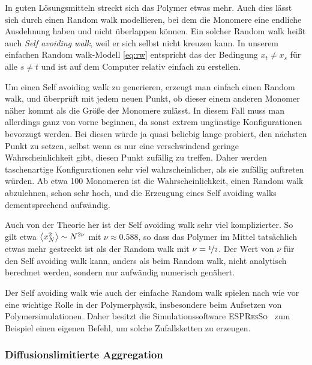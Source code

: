 In guten Lösungsmitteln streckt sich das Polymer etwas mehr. Auch dies
lässt sich durch einen Random walk modellieren, bei dem die Monomere
eine endliche Ausdehnung haben und nicht überlappen können. Ein
solcher Random walk heißt auch \emph{Self avoiding walk}, weil er sich
selbst nicht kreuzen kann. In unserem einfachen Random walk-Modell
\eqref{eq:rw} entspricht das der Bedingung $x_t\neq x_s$ für alle
$s\neq t$ und ist auf dem Computer relativ einfach zu erstellen.

Um einen Self avoiding walk zu generieren, erzeugt man einfach einen
Random walk, und überprüft mit jedem neuen Punkt, ob dieser einem
anderen Monomer näher kommt als die Größe der Monomere zulässt. In
diesem Fall muss man allerdings ganz von vorne beginnen, da sonst
extrem ungünstige Konfigurationen bevorzugt werden. Bei diesen würde
ja quasi beliebig lange probiert, den nächsten Punkt zu setzen, selbst
wenn es nur eine verschwindend geringe Wahrscheinlichkeit gibt, diesen
Punkt zufällig zu treffen. Daher werden taschenartige Konfigurationen
sehr viel wahrscheinlicher, als sie zufällig auftreten würden. Ab etwa
100 Monomeren ist die Wahrscheinlichkeit, einen Random walk
abzulehnen, schon sehr hoch, und die Erzeugung eines Self avoiding
walks dementsprechend aufwändig.

Auch von der Theorie her ist der Self avoiding walk sehr viel
komplizierter. So gilt etwa $\left\langle{x_N^2}\right\rangle \sim N^{2\nu}$ mit
$\nu\approx 0.588$, so dass das Polymer im Mittel tatsächlich etwas
mehr gestreckt ist als der Random walk mit $\nu=\nicefrac{1}{2}$. Der
Wert von $\nu$ für den Self avoiding walk kann, anders als beim Random
walk, nicht analytisch berechnet werden, sondern nur aufwändig
numerisch genähert.

Der Self avoiding walk wie auch der einfache Random walk spielen
nach wie vor eine wichtige Rolle in der Polymerphysik, insbesondere
beim Aufsetzen von Polymersimulationen. Daher besitzt die
Simulationssoftware \textsc{ESPResSo}~\cite{espresso} zum Beispiel
einen eigenen Befehl, um solche Zufallsketten zu erzeugen.

\subsubsection{Diffusionslimitierte Aggregation}

